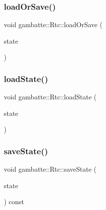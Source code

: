 \mbox{\label{classgambatte_1_1Rtc_ac38be521ff567763689059ce538bd320}} 
\subsubsection{\texorpdfstring{load\+Or\+Save()}{loadOrSave()}}
{\footnotesize\ttfamily void gambatte\+::\+Rtc\+::load\+Or\+Save (\begin{DoxyParamCaption}\item[{\hyperlink{classgambatte_1_1loadsave}{loadsave} \&}]{state }\end{DoxyParamCaption})}

\mbox{\label{classgambatte_1_1Rtc_a00b679656de31227d310103c2fbc6dda}} 
\subsubsection{\texorpdfstring{load\+State()}{loadState()}}
{\footnotesize\ttfamily void gambatte\+::\+Rtc\+::load\+State (\begin{DoxyParamCaption}\item[{\hyperlink{structgambatte_1_1SaveState}{Save\+State} const \&}]{state }\end{DoxyParamCaption})}

\mbox{\label{classgambatte_1_1Rtc_a15dc530ecbc4a08b87cccbbef7edf236}} 
\subsubsection{\texorpdfstring{save\+State()}{saveState()}}
{\footnotesize\ttfamily void gambatte\+::\+Rtc\+::save\+State (\begin{DoxyParamCaption}\item[{\hyperlink{structgambatte_1_1SaveState}{Save\+State} \&}]{state }\end{DoxyParamCaption}) const}

\mbox{\label{classgambatte_1_1Rtc_ae920c8c9653060f77518ebc8ef9b2369}} 
